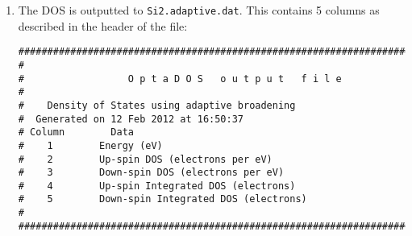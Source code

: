 \documentclass[a4paper,11pt,twoside]{book}
\begin{document}
{\begin{enumerate}
Since we had \verb#efermi : optados#, \optados\ sets the internal value of the Fermi level to the one it has derived from the DOS. This is important for subsequent calculations. Other valid options are \verb#file#, where \optados\ uses the value calculated by the electronic structure code that generated the eigenvalues;  \verb#insulator#, where \optados\ uses a value calculated from assuming the system is non-metallic; or a value set by the user.

\optados\ now performs some analysis of the DOS at the Fermi level,
\begin{verbatim}
+----------------------- DOS at Fermi Energy Analysis ------------------------+
|                          Fermi energy used :   5.4109 eV                    |
| From Adaptive broadening                                                    |
|   Spin Component : 1   DOS at Fermi Energy :   0.0011 eln/cell       <- DEA |
|   Spin Component : 2   DOS at Fermi Energy :   0.0011 eln/cell       <- DEA |
+-----------------------------------------------------------------------------+
\end{verbatim}
From this we may assume that there is a band gap.

Importantly, then \optados\ calculates the band energy from the DOS is has calculated.
\begin{verbatim}
+--------------------------- Band Energy Analysis ----------------------------+
|          Band energy (Adaptive broadening) :       1.3609 eV         <- BEA |
|                  Band energy (From CASTEP) :       1.3622 eV         <- BEC |
+-----------------------------------------------------------------------------+
\end{verbatim}
As the quality of the \optados\ calculation is increased these two values should converge to the same answer.

Finally \optados\ shifts the Fermi level to 0\,eV, for the output files.

\item  The DOS is outputted to {\tt Si2.adaptive.dat}. This contains 5 columns as described in the header of the file:
\begin{verbatim}
########################################################################
#
#                  O p t a D O S   o u t p u t   f i l e
#
#    Density of States using adaptive broadening
#  Generated on 12 Feb 2012 at 16:50:37
# Column        Data
#    1        Energy (eV)
#    2        Up-spin DOS (electrons per eV)
#    3        Down-spin DOS (electrons per eV)
#    4        Up-spin Integrated DOS (electrons)
#    5        Down-spin Integrated DOS (electrons)
#
########################################################################
\end{verbatim}


\end{enumerate}}
\end{document}
